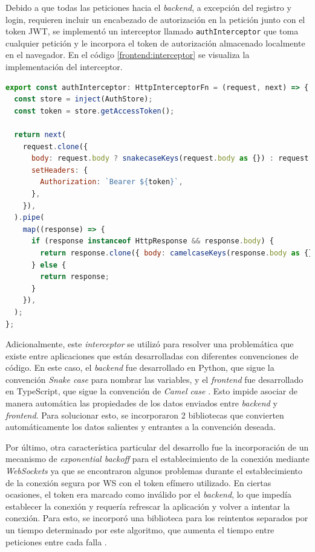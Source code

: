 Debido a que todas las peticiones hacia el \textit{backend}, a excepción del registro y login, requieren incluir un encabezado de autorización en la petición junto con el token JWT, se implementó un interceptor llamado \texttt{authInterceptor} que toma cualquier petición y le incorpora el token de autorización almacenado localmente en el navegador. En el código \ref{frontend:interceptor} se visualiza la implementación del interceptor.

\begin{lstlisting}[language=JavaScript,label=frontend:interceptor,caption=Definición del \textit{authInterceptor}.]  % Start your code-block
export const authInterceptor: HttpInterceptorFn = (request, next) => {
  const store = inject(AuthStore);
  const token = store.getAccessToken();

  return next(
    request.clone({
      body: request.body ? snakecaseKeys(request.body as {}) : request.body,
      setHeaders: {
        Authorization: `Bearer ${token}`,
      },
    }),
  ).pipe(
    map((response) => {
      if (response instanceof HttpResponse && response.body) {
        return response.clone({ body: camelcaseKeys(response.body as {}) });
      } else {
        return response;
      }
    }),
  );
};


\end{lstlisting}

Adicionalmente, este \textit{interceptor} se utilizó para resolver una problemática que existe entre aplicaciones que están desarrolladas con diferentes convenciones de código. En este caso, el \textit{backend} fue desarrollado en Python, que sigue la convención \textit{Snake case} \citep{CODE:1} para nombrar las variables, y el \textit{frontend} fue desarrollado en TypeScript, que sigue la convención de \textit{Camel case} \citep{CODE:1}. Esto impide asociar de manera automática las propiedades de los datos enviados entre \textit{backend} y \textit{frontend}. Para solucionar esto, se incorporaron 2 bibliotecas que convierten automáticamente los datos salientes y entrantes a la convención deseada.

Por último, otra característica particular del desarrollo fue la incorporación de un mecanismo de \textit{exponential backoff} para el establecimiento de la conexión mediante \textit{WebSockets} ya que se encontraron algunos problemas durante el establecimiento de la conexión segura por WS con el token efímero utilizado. En ciertas ocasiones, el token era marcado como inválido por el \textit{backend}, lo que impedía establecer la conexión y requería refrescar la aplicación y volver a intentar la conexión. Para esto, se incorporó una biblioteca para los reintentos separados por un tiempo determinado por este algoritmo, que aumenta el tiempo entre peticiones entre cada falla \citep{BACKOFF:1}.

